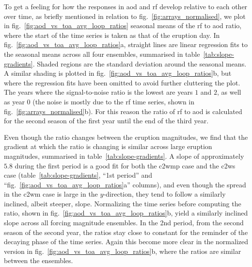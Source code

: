\documentclass{ametsocV6.1}
\begin{document}
To get a feeling for how the responses in \gls{aod} and \gls{rf} develop relative to
each other over time, as briefly mentioned in relation to
fig.~\ref{fig:arrays_normalised}, we plot in fig.~\ref{fig:aod_vs_toa_avg_loop_ratios}
seasonal means of the \gls{rf} to \gls{aod} ratio, where the start of the time series is
taken as that of the eruption day. In fig.~\ref{fig:aod_vs_toa_avg_loop_ratios}a,
straight lines are linear regression fits to the seasonal means across all four
ensembles, summarised in table~\ref{tab:slope-gradients}. Shaded regions are the
standard deviation around the seasonal means. A similar shading is plotted in
fig.~\ref{fig:aod_vs_toa_avg_loop_ratios}b, but where the regression fits have been
omitted to avoid further cluttering the plot. The years where the signal-to-noise ratio
is the lowest are years \(1\) and \(2\), as well as year \(0\) (the noise is mostly due
to the \gls{rf} time series, shown in fig.~\ref{fig:arrays_normalised}b). For this
reason the ratio of \gls{rf} to \gls{aod} is calculated for the second season of the
first year until the end of the third year.

Even though the ratio changes between the eruption magnitudes, we find that the gradient
at which the ratio is changing is similar across large eruption magnitudes, summarised
in table~\ref{tab:slope-gradients}. A slope of approximately \(5.8\) during the first
period is a good fit for both the \gls{c2wmp} case and the \gls{c2ws} case
(table~\ref{tab:slope-gradients}, ``1st period'' and
``fig.~\ref{fig:aod_vs_toa_avg_loop_ratios}a'' columns), and even though the spread in
the \gls{c2wm} case is large in the \(y\)-direction, they tend to follow a similarly
inclined, albeit steeper, slope. Normalizing the time series before computing the ratio,
shown in fig.~\ref{fig:aod_vs_toa_avg_loop_ratios}b, yield a similarly inclined slope
across all forcing magnitude ensembles. In the 2nd period, from the second season of the
second year, the ratios stay close to constant for the reminder of the decaying phase of
the time series. Again this become more clear in the normalized version in
fig.~\ref{fig:aod_vs_toa_avg_loop_ratios}b, where the ratios are similar between the
ensembles.
\end{document}
